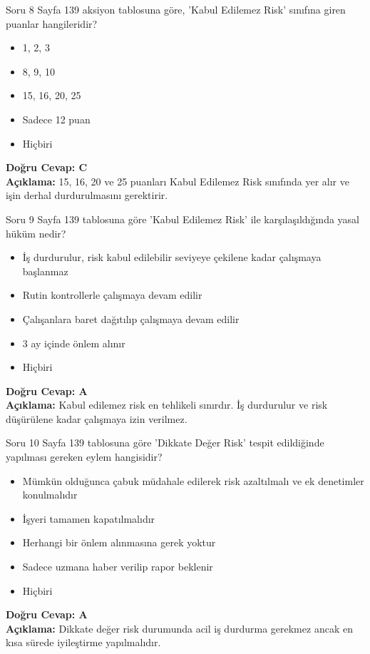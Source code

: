 \documentclass[12pt,a4paper]{article}
\begin{document}
\begin{testcard}{Soru 8}
    Sayfa 139 aksiyon tablosuna göre, 'Kabul Edilemez Risk' sınıfına giren puanlar hangileridir?
    \begin{itemize}
        \item[A)] 1, 2, 3
        \item[B)] 8, 9, 10
        \item[C)] 15, 16, 20, 25
        \item[D)] Sadece 12 puan
        \item[E)] Hiçbiri
    \end{itemize}
    \tcblower
    \textbf{Doğru Cevap: C} \\
    \textbf{Açıklama:} 15, 16, 20 ve 25 puanları Kabul Edilemez Risk sınıfında yer alır ve işin derhal durdurulmasını gerektirir.
\end{testcard}

\begin{testcard}{Soru 9}
    Sayfa 139 tablosuna göre 'Kabul Edilemez Risk' ile karşılaşıldığında yasal hüküm nedir?
    \begin{itemize}
        \item[A)] İş durdurulur, risk kabul edilebilir seviyeye çekilene kadar çalışmaya başlanmaz
        \item[B)] Rutin kontrollerle çalışmaya devam edilir
        \item[C)] Çalışanlara baret dağıtılıp çalışmaya devam edilir
        \item[D)] 3 ay içinde önlem alınır
        \item[E)] Hiçbiri
    \end{itemize}
    \tcblower
    \textbf{Doğru Cevap: A} \\
    \textbf{Açıklama:} Kabul edilemez risk en tehlikeli sınırdır. İş durdurulur ve risk düşürülene kadar çalışmaya izin verilmez.
\end{testcard}

\begin{testcard}{Soru 10}
    Sayfa 139 tablosuna göre 'Dikkate Değer Risk' tespit edildiğinde yapılması gereken eylem hangisidir?
    \begin{itemize}
        \item[A)] Mümkün olduğunca çabuk müdahale edilerek risk azaltılmalı ve ek denetimler konulmalıdır
        \item[B)] İşyeri tamamen kapatılmalıdır
        \item[C)] Herhangi bir önlem alınmasına gerek yoktur
        \item[D)] Sadece uzmana haber verilip rapor beklenir
        \item[E)] Hiçbiri
    \end{itemize}
    \tcblower
    \textbf{Doğru Cevap: A} \\
    \textbf{Açıklama:} Dikkate değer risk durumunda acil iş durdurma gerekmez ancak en kısa sürede iyileştirme yapılmalıdır.
\end{testcard}
\end{document}

